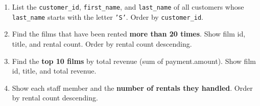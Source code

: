 \documentclass[12pt,a4paper]{article}
\newif\ifshowsolutions
\begin{document}
\begin{enumerate}

\item List the \texttt{customer\_id}, \texttt{first\_name}, and \texttt{last\_name} of all customers whose \texttt{last\_name} starts with the letter \texttt{'S'}. Order by \texttt{customer\_id}.

\ifshowsolutions
\begin{lstlisting}[language=SQL]
SELECT customer_id, first_name, last_name
FROM customer
WHERE last_name LIKE 'S%'
ORDER BY customer_id;
\end{lstlisting}
\fi


\item Find the films that have been rented \textbf{more than 20 times}. 
Show film id, title, and rental count. Order by rental count descending.

\ifshowsolutions
\begin{lstlisting}[language=SQL]
SELECT f.film_id, f.title,
       COUNT(r.rental_id) AS rental_count
FROM film f
JOIN inventory i ON i.film_id = f.film_id
JOIN rental r ON r.inventory_id = i.inventory_id
GROUP BY f.film_id, f.title
HAVING COUNT(r.rental_id) > 20
ORDER BY rental_count DESC, f.film_id;
\end{lstlisting}
\fi


\item Find the \textbf{top 10 films} by total revenue (sum of payment.amount). Show film id, title, and total revenue.

\ifshowsolutions
\begin{lstlisting}[language=SQL]
SELECT f.film_id, f.title,
       SUM(p.amount) AS total_revenue
FROM film f
JOIN inventory i ON i.film_id = f.film_id
JOIN rental r ON r.inventory_id = i.inventory_id
JOIN payment p ON p.rental_id = r.rental_id
GROUP BY f.film_id, f.title
ORDER BY total_revenue DESC, f.film_id
LIMIT 10;
\end{lstlisting}
\fi

\item Show each staff member and the \textbf{number of rentals they handled}. Order by rental count descending.

\ifshowsolutions
\begin{lstlisting}[language=SQL]
SELECT s.staff_id, s.first_name, s.last_name,
       COUNT(r.rental_id) AS rentals_handled
FROM staff s
LEFT JOIN rental r ON r.staff_id = s.staff_id
GROUP BY s.staff_id, s.first_name, s.last_name
ORDER BY rentals_handled DESC, s.staff_id;
\end{lstlisting}
\fi


\end{enumerate}
\end{document}
